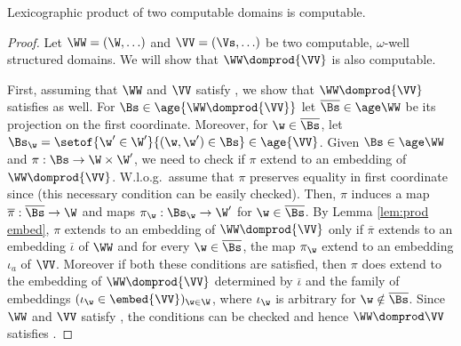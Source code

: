 %
\begin{lemmarep}\label{lem:lex comp}
Lexicographic product of two computable domains is computable.
\end{lemmarep}
%
\begin{proof}
Let $\WW = (\W, \ldots)$ and $\VV = (\Vs, \ldots)$ be two computable, $\omega$-well structured domains.
We will show that $\WW \domprod {\VV}$ is also computable.
%
%

First, assuming that $\WW$ and $\VV$ satisfy ,
we show that $\WW \domprod {\VV}$ satisfies  as well.
For $\Bs \in \age {\WW \domprod {\VV}}$ let $\overline\Bs\in\age\WW$ be its projection
on the first coordinate.
Moreover, for $\w\in\overline\Bs$, let $\Bs_\w = \setof{\w'\in\W'}{(\w, \w')\in\Bs} \in \age{\VV}$.
Given $\Bs\in\age\WW$ and $\pi : \Bs\to\W\times\W'$, 
we need to check if $\pi$ extend to an embedding of $\WW \domprod {\VV}$.
W.l.o.g.~assume that $\pi$ preserves equality in first coordinate since (this necessary condition can be easily checked).
Then, $\pi$ induces a map $\overline \pi : \overline \Bs \to \W$ and maps $\pi_\w : \Bs_\w  \to \W'$ for 
$\w \in \overline\Bs$.
By Lemma \ref{lem:prod embed}, $\pi$ extends to an embedding of $\WW \domprod {\VV}$ 
only if $\overline\pi$ extends to an embedding $\overline\iota$ of $\WW$ and for every 
$\w\in\overline\Bs$, the map $\pi_\w$ extend to an embedding $\iota_a$ of $\VV$.
Moreover if both these conditions are satisfied, 
then $\pi$ does extend to the embedding of $\WW \domprod {\VV}$ determined by $\overline\iota$ and 
the family of embeddings $(\iota_\w \in \embed{\VV})_{\w\in\W}$, where
$\iota_\w$ is arbitrary for $\w\notin\overline\Bs$.
Since $\WW$ and $\VV$ satisfy ,
the conditions can be checked and hence $\WW \domprod \VV$ satisfies .
\smallskip


\end{proof}
